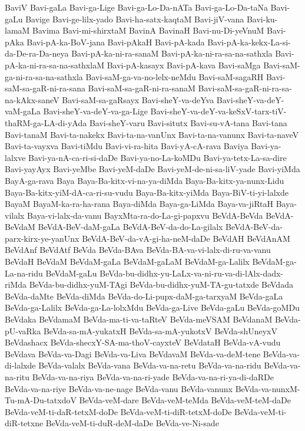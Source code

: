 {BaviV
Bavi-gaLa
Bavi-ga-Lige
Bavi-ga-Lo-Da-nATa
Bavi-ga-Lo-Da-taNa
Bavi-gaLu
Bavige
Bavi-ge-lilx-yado
Bavi-ha-satx-kaqtaM
Bavi-jiV-vana
Bavi-ku-lamaM
Bavima
Bavi-mi-shirxtaM
BavinA
BavinaH
Bavi-nu-Di-yeVnuM
Bavi-pAka
Bavi-pA-ka-BoV-jana
Bavi-pAkaH
Bavi-pA-kada
Bavi-pA-ka-kekx-La-si-da-De-ra-Da-neya
Bavi-pA-ka-ni-ra-sanaM
Bavi-pA-ka-ni-ra-sa-na-sathxla
Bavi-pA-ka-ni-ra-sa-na-sathxlaM
Bavi-pA-kasayx
Bavi-pA-kava
Bavi-saMga
Bavi-saM-ga-ni-ra-sa-na-sathxla
Bavi-saM-ga-va-no-lelx-neMdu
Bavi-saM-sagaRH
Bavi-saM-sa-gaR-ni-ra-sana
Bavi-saM-sa-gaR-ni-ra-sanaM
Bavi-saM-sa-gaR-ni-ra-sa-na-kAkx-saneV
Bavi-saM-sa-gaRsayx
Bavi-sheY-va-deYva
Bavi-sheY-va-deY-vaM-gaLa
Bavi-sheY-va-deY-va-ga-Lige
Bavi-sheY-va-deY-va-keSxV-tarx-tiV-thaRM-ga-LA-di-yAda
Bavi-sheY-varu
Bavi-situtx
Bavi-su-vA-tana
Bavi-tana
Bavi-tanaM
Bavi-ta-nakekx
Bavi-ta-na-vanUnx
Bavi-ta-na-vanunx
Bavi-ta-naveV
Bavi-ta-vayxva
Bavi-tiMdu
Bavi-vi-ra-hita
Bavi-yA-cA-rava
Baviya
Bavi-ya-lalxve
Bavi-ya-nA-ca-ri-si-daDe
Bavi-ya-no-La-koMDu
Bavi-ya-tetx-La-sa-dire
Bavi-yayAyx
Bavi-yeMbe
Bavi-yeM-daDe
Bavi-yeM-de-ni-sa-liV-yade
Bavi-yiMda
BayA-ga-rava
Baya
Baya-Ba-kitx-vi-na-ya-diMda
Baya-Ba-kitx-ya-nunx-Lidu
Baya-Ba-kitx-yiM-dA-ca-ri-su-vudu
Baya-Ba-kitx-yiMda
Baya-BiV-ti-yi-lalxde
BayaM
BayaM-ka-ra-ha-rana
Baya-diMda
Baya-ga-LiMda
Baya-va-jiRtaH
Baya-vilalx
Baya-vi-lalx-da-vanu
BayxMta-ra-do-La-gi-papxvu
BeVdA-BeVda
BeVdA-BeVdaM
BeVdA-BeV-daM-gaLa
BeVdA-BeV-da-do-La-gilalx
BeVdA-BeV-da-parx-kirx-ye-yanUnx
BeVdA-BeV-da-vA-gi-ha-neM-daDe
BeVdAH
BeVdAnAM
BeVdAnf
BeVdAtf
BeVda
BeVda-BAva
BeVda-BA-va-vi-lalx-di-ru-va-vanu
BeVdaH
BeVdaM
BeVdaM-gaLa
BeVdaM-gaLaM
BeVdaM-ga-Lalilx
BeVdaM-ga-La-na-ridu
BeVdaM-gaLu
BeVda-bu-didhx-yu-LaLx-va-ni-ru-va-di-lAlx-dadx-riMda
BeVda-bu-didhx-yuM-TAgi
BeVda-bu-didhx-yuM-TA-gu-tatxde
BeVdada
BeVda-daMte
BeVda-diMda
BeVda-do-Li-pupx-daM-ga-tarxyaM
BeVda-gaLa
BeVda-ga-Lalilx
BeVda-ga-La-lolxMdu
BeVda-ga-Live
BeVda-gaLu
BeVda-goMDu
BeVdaka
BeVdamaM
BeVda-ma-ti-va-taRteV
BeVda-meVSAM
BeVdanaM
BeVda-pU-vaRka
BeVda-sa-mA-yukatxH
BeVda-sa-mA-yukotxV
BeVda-shUneyxV
BeVdashacx
BeVda-shecxY-SA-ma-thoV-cayxteV
BeVdataH
BeVda-vA-vudu
BeVdava
BeVda-va-Dagi
BeVda-va-Liva
BeVdavaM
BeVda-va-deM-tene
BeVda-va-di-lalxde
BeVda-valalx
BeVda-vana
BeVda-va-na-retu
BeVda-va-na-ridu
BeVda-va-na-ritu
BeVda-va-na-riya
BeVda-va-na-ri-yade
BeVda-va-na-ri-ya-di-daRDe
BeVda-va-na-riye
BeVda-va-ne-nage
BeVda-vanu
BeVda-vanunx
BeVda-va-nunxM-Tu-mA-Du-tatxdoV
BeVda-veM-dare
BeVda-veM-teMda
BeVda-veM-teM-daDe
BeVda-veM-ti-daR-tetxM-doDe
BeVda-veM-ti-diR-tetxM-doDe
BeVda-veM-ti-diR-tetxne
BeVda-veM-ti-duR-deM-daDe
BeVda-ve-Ni-sade
}
